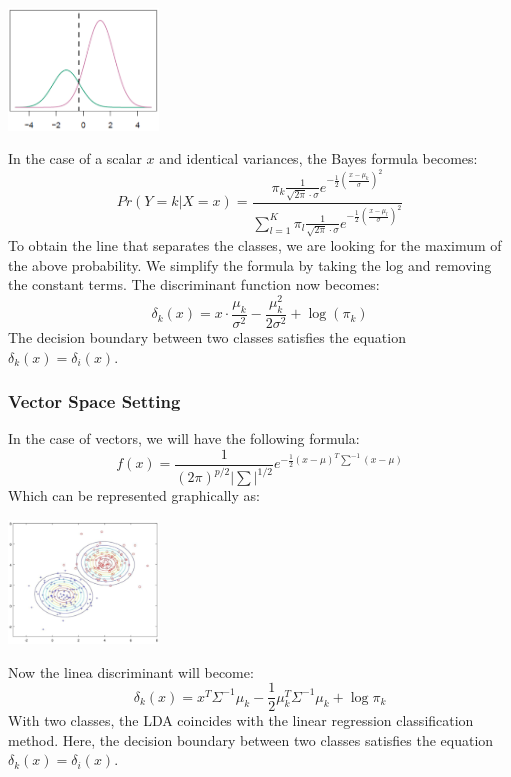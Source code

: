\documentclass{article}
\begin{document}
\begin{center}
	\includegraphics[width=4cm]{lda.png}
\end{center}
In the case of a scalar $x$ and identical variances, the Bayes formula becomes:
\[ Pr(Y = k|X = x) = \frac{\pi_k\frac{1}{\sqrt{2\pi} \cdot \sigma}e^{-\frac{1}{2}\left( \frac{x-\mu_k}{\sigma} \right)^2}}{\sum^K_{l=1} \pi_l\frac{1}{\sqrt{2\pi} \cdot \sigma}e^{-\frac{1}{2}\left( \frac{x-\mu_l}{\sigma} \right)^2}} \]
To obtain the line that separates the classes, we are looking for the maximum of the above probability. We simplify the formula by taking the log and removing the constant terms. The discriminant function now becomes:
\[ \delta_k(x) = x \cdot \frac{\mu_k}{\sigma^2} - \frac{\mu^2_k}{2\sigma^2} + \log(\pi_k) \]
The decision boundary between two classes satisfies the equation $\delta_k(x) = \delta_i(x)$.

\subsubsection{Vector Space Setting}
In the case of vectors, we will have the following formula:
\[ f(x) = \frac{1}{(2\pi)^{p/2}|\sum|^{1/2}} e^{-\frac{1}{2}(x-\mu)^T \sum^{-1}(x-\mu)} \]
Which can be represented graphically as:

\begin{center}
	\includegraphics[width=4cm]{lda_vectors.png}
\end{center}
Now the linea discriminant will become:
\[ \delta_k(x) = x^T \Sigma^{-1} \mu_k - \frac{1}{2}\mu^T_k \Sigma^{-1}\mu_k + \log \pi_k \]
With two classes, the LDA coincides with the linear regression classification method. Here, the decision boundary between two classes satisfies the equation $\delta_k(x) = \delta_i(x)$.
\end{document}
